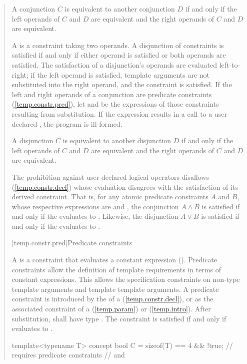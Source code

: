 \begin{quote}
\pnum
A conjunction $C$ is equivalent to another conjunction $D$
if and only if the left operands of $C$ and $D$ are equivalent
and the right operands of $C$ and $D$ are equivalent.

\pnum
A  is a constraint taking two 
operands. A disjunction of constraints is satisfied if and only 
if either operand is satisfied or both operands are satisfied.
% 
The satisfaction of a disjunction's operands are evaluated left-to-right; 
if the left operand is satisfied, template arguments are not 
substituted into the right operand, and the constraint is satisfied.
%
If the left and right operands of a conjunction are predicate constraints
(\ref{temp.constr.pred}), let  and  be the expressions
of those constraints resulting from substitution. If the expression
 results in a call to a user-declared ,
the program is ill-formed.

\pnum
A disjunction $C$ is equivalent to another disjunction $D$
if and only if the left operands of $C$ and $D$ are equivalent
and the right operands of $C$ and $D$ are equivalent.

\pnum
\enternote
The prohibition against user-declared logical operators disallows
 (\ref{temp.constr.decl}) whose 
evaluation disagrees with the satisfaction of its derived constraint.
That is, for any atomic predicate constraints $A$ and $B$, whose
respective expressions are  and ,
the conjunction $A \land B$ is satisfied if and only if
the   evaluates to
. Likewise, the disjunction $A \lor B$ is satisfied 
if and only if the  
evaluates to .
\exitnote


[temp.constr.pred]{Predicate constraints}

\pnum
A  is a constraint that evaluates a constant 
expression  ().
% 
\enternote
Predicate constraints allow the definition of template requirements
in terms of constant expressions. This allows the specification 
constraints on non-type template arguments and template template 
arguments.
\exitnote
% 
\enternote
A predicate constraint is introduced by the 
of a 
 (\ref{temp.constr.decl}), 
or as the associated constraint of a
 (\ref{temp.param}) or
 (\ref{temp.intro}).
\exitnote
% 
After substitution,  shall have type .
% 
The constraint is satisfied if and only if  evaluates to 
.
% 
\enterexample
\begin{codeblock}
template<typename T> 
  concept bool C = sizeof(T) == 4 && !true; // requires predicate constraints
                                            //  and 


\end{codeblock}
\end{quote}
